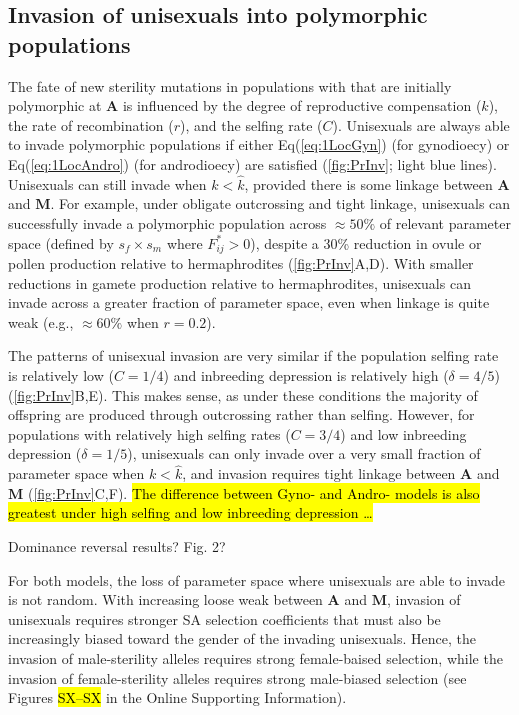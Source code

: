 \documentclass[9pt,twocolumn,twoside,lineno]{gsajnl}
\begin{document}
\subsection{Invasion of unisexuals into polymorphic populations}

The fate of new sterility mutations in populations with that are initially polymorphic at $\mathbf{A}$ is influenced by the degree of reproductive compensation ($k$), the rate of recombination ($r$), and the selfing rate ($C$). Unisexuals are always able to invade polymorphic populations if either Eq(\ref{eq:1LocGyn}) (for gynodioecy) or Eq(\ref{eq:1LocAndro}) (for androdioecy) are satisfied (\ref{fig:PrInv}; light blue lines). Unisexuals can still invade when $k < \hat{k}$, provided there is some linkage between $\mathbf{A}$ and $\mathbf{M}$. For example, under obligate outcrossing and tight linkage, unisexuals can successfully invade a polymorphic population across $\approx 50\%$ of relevant parameter space (defined by $s_f \times s_m$ where $F^{\ast}_{ij} > 0$), despite a 30\% reduction in ovule or pollen production relative to hermaphrodites (\ref{fig:PrInv}A,D). With smaller reductions in gamete production relative to hermaphrodites, unisexuals can invade across a greater fraction of parameter space, even when linkage is quite weak (e.g., $\approx 60\%$ when $r = 0.2$). 

The patterns of unisexual invasion are very similar if the population selfing rate is relatively low ($C = 1/4$) and inbreeding depression is relatively high ($\delta = 4/5$) (\ref{fig:PrInv}B,E). This makes sense, as under these conditions the majority of offspring are produced through outcrossing rather than selfing. However, for populations with relatively high selfing rates ($C = 3/4$) and low inbreeding depression ($\delta = 1/5$), unisexuals can only invade over a very small fraction of parameter space when $k < \hat{k}$, and invasion requires tight linkage between $\mathbf{A}$ and $\mathbf{M}$ (\ref{fig:PrInv}C,F). \hl{The difference between Gyno- and Andro- models is also greatest under high selfing and low inbreeding depression \ldots}

Dominance reversal results? Fig. 2?

For both models, the loss of parameter space where unisexuals are able to invade is not random. With increasing loose weak between $\mathbf{A}$ and $\mathbf{M}$, invasion of unisexuals requires stronger SA selection coefficients that must also be increasingly biased toward the gender of the invading unisexuals. Hence, the invasion of male-sterility alleles requires strong female-baised selection, while the invasion of female-sterility alleles requires strong male-biased selection (see Figures \hl{SX--SX} in the Online Supporting Information). 
\end{document}
